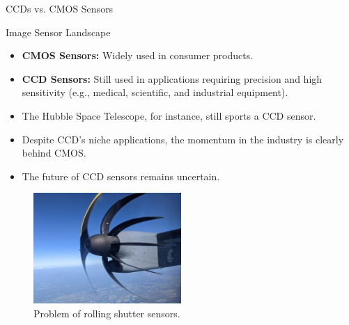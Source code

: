 \documentclass{loyola-beamer}
\begin{document}
\begin{frame}{CCDs vs. CMOS Sensors}
	\begin{block}{Image Sensor Landscape}
		\begin{itemize}
			\item \textbf{CMOS Sensors:} Widely used in consumer products.
			\item \textbf{CCD Sensors:} Still used in applications requiring precision and high sensitivity (e.g., medical, scientific, and industrial equipment).
			\item The Hubble Space Telescope, for instance, still sports a CCD sensor.
		\end{itemize}
	\end{block}

	\vspace{0.5cm}

	\begin{itemize}
		\item Despite CCD's niche applications, the momentum in the industry is clearly behind CMOS.
		\item The future of CCD sensors remains uncertain.\cite{CCDArticle}
	\end{itemize}
\end{frame}

\begin{frame}
	\begin{figure}
		\begin{center}
			\includegraphics[width=0.5\textwidth]{./figures/rolling-shutter.jpg}
		\end{center}
		\caption{Problem of rolling shutter sensors.}
	\end{figure}
\end{frame}
\end{document}
